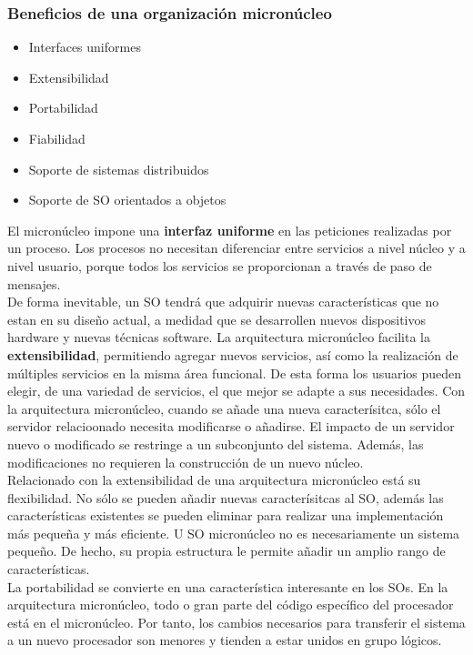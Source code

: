 \documentclass{article}
\begin{document}
			\subsubsection{Beneficios de una organización micronúcleo}
				\begin{itemize}
				\item Interfaces uniformes
				\item Extensibilidad
				\item Portabilidad
				\item Fiabilidad
				\item Soporte de sistemas distribuidos
				\item Soporte de SO orientados a objetos
				\end{itemize}
				
				El micronúcleo impone una \textbf{interfaz uniforme} en las peticiones realizadas por un proceso. Los procesos no necesitan diferenciar entre servicios a nivel núcleo y a nivel usuario, porque todos los servicios se proporcionan a través de paso de mensajes. \\
				
				De forma inevitable, un SO tendrá que adquirir nuevas características que no estan en su diseño actual, a medidad que se desarrollen nuevos dispositivos hardware y nuevas técnicas software. La arquitectura micronúcleo facilita la \textbf{extensibilidad}, permitiendo agregar nuevos servicios, así como la realización de múltiples servicios en la misma área funcional. De esta forma los usuarios pueden elegir, de una variedad de servicios, el que mejor se adapte a sus necesidades. Con la arquitectura micronúcleo, cuando se añade una nueva caracterísitca, sólo el servidor relacioonado necesita modificarse o añadirse. El impacto de un servidor nuevo o modificado se restringe a un subconjunto del sistema. Además, las modificaciones no requieren la construcción de un nuevo núcleo. \\
				
				Relacionado con la extensibilidad de una arquitectura micronúcleo está su flexibilidad. No sólo se pueden añadir nuevas caracterísitcas al SO, además las características existentes se pueden eliminar para realizar una implementación más pequeña y más eficiente. U SO micronúcleo no es necesariamente un sistema pequeño. De hecho, su propia estructura le permite añadir un amplio rango de características. \\
				
				La portabilidad se convierte en una característica interesante en los SOs. En la arquitectura micronúcleo, todo o gran parte del código específico del procesador está en el micronúcleo. Por tanto, los cambios necesarios para transferir el sistema a un nuevo procesador son menores y tienden a estar unidos en grupo lógicos. \\
				
\end{document}
